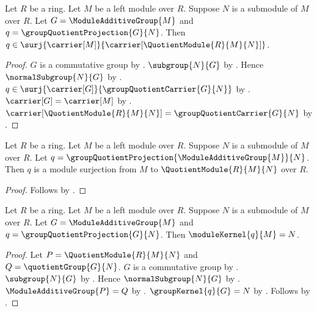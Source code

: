 \begin{theorem}\label{quotient_module_projection_surjective}
    Let $R$ be a ring.
    Let $M$ be a left module over $R$.
    Suppose $N$ is a submodule of $M$ over $R$.
    Let $G=\ModuleAdditiveGroup{M}$ and
        $q=\groupQuotientProjection{G}{N}$.
    Then $q\in\surj{\carrier[M]}{
        \carrier[\QuotientModule{R}{M}{N}]}$.
\end{theorem}
\begin{proof}
    $G$ is a commutative group by
        .
    $\subgroup{N}{G}$ by .
    Hence $\normalSubgroup{N}{G}$ by
        .
    $q\in\surj{\carrier[G]}{\groupQuotientCarrier{G}{N}}$ by
        .
    $\carrier[G]=\carrier[M]$ by
        .
    $\carrier[\QuotientModule{R}{M}{N}]
        =\groupQuotientCarrier{G}{N}$ by
        .
\end{proof}

\begin{corollary}\label{quotient_module_projection_module_surjection}
    Let $R$ be a ring.
    Let $M$ be a left module over $R$.
    Suppose $N$ is a submodule of $M$ over $R$.
    Let $q=\groupQuotientProjection{\ModuleAdditiveGroup{M}}{N}$.
    Then $q$ is a module surjection from $M$ to
        $\QuotientModule{R}{M}{N}$ over $R$.
\end{corollary}
\begin{proof}
    Follows by
        .
\end{proof}

\begin{theorem}\label{quotient_module_projection_kernel}
    Let $R$ be a ring.
    Let $M$ be a left module over $R$.
    Suppose $N$ is a submodule of $M$ over $R$.
    Let $G=\ModuleAdditiveGroup{M}$ and
        $q=\groupQuotientProjection{G}{N}$.
    Then
        $\moduleKernel{q}{M}=N$.
\end{theorem}
\begin{proof}
    Let $P=\QuotientModule{R}{M}{N}$ and
        $Q=\quotientGroup{G}{N}$.
    $G$ is a commutative group by
        .
    $\subgroup{N}{G}$ by .
    Hence $\normalSubgroup{N}{G}$ by
        .
    $\ModuleAdditiveGroup{P}=Q$ by
        .
    $\groupKernel{q}{G}=N$ by
        .
    Follows by .
\end{proof}
